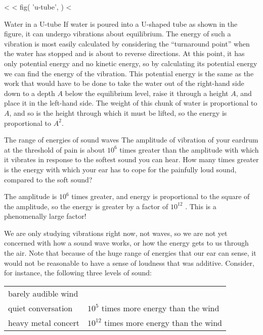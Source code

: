 <%
<%
  fig(
    'u-tube',
  )
<%
\begin{eg}{Water in a U-tube}\label{eg:u-tube}
If water is poured into a U-shaped tube as shown in the
figure, it can undergo vibrations about equilibrium. The
energy of such a vibration is most easily calculated by
considering the ``turnaround point'' when the water has
stopped and is about to reverse directions. At this point,
it has only potential energy and no kinetic energy, so by
calculating its potential energy we can find the energy of
the vibration. This potential energy is the same as the work
that would have to be done to take the water out of the
right-hand side down to a depth $A$ below the equilibrium
level, raise it through a height $A$, and place it in the
left-hand side. The weight of this chunk of water is
proportional to $A$, and so is the height through which it
must be lifted, so the energy is proportional to $A^2$.
\end{eg}

\begin{eg}{The range of energies of sound waves}
\egquestion The amplitude of vibration of your eardrum at the
threshold of pain is about $10^6$ times greater than the
amplitude with which it vibrates in response to the softest
sound you can hear. How many times greater is the energy
with which your ear has to cope for the painfully loud
sound, compared to the soft sound?

\eganswer The amplitude is $10^6$ times greater, and energy
is proportional to the square of the amplitude, so the
energy is greater by a factor of $10^{12}$ . This is a
phenomenally large factor!
\end{eg}

We are only studying vibrations right now, not waves, so we
are not yet concerned with how a sound wave works, or how
the energy gets to us through the air. Note that because of
the huge range of energies that our ear can sense, it would
not be reasonable to have a sense of loudness that was
additive. Consider, for instance, the following three levels of sound:

\begin{tabular}{p{40mm}p{53mm}}
barely audible wind\\
quiet conversation \dotfill & $10^5$ times more energy than the wind\\
heavy metal concert \dotfill & $10^{12}$ times more energy than the wind
\end{tabular}

